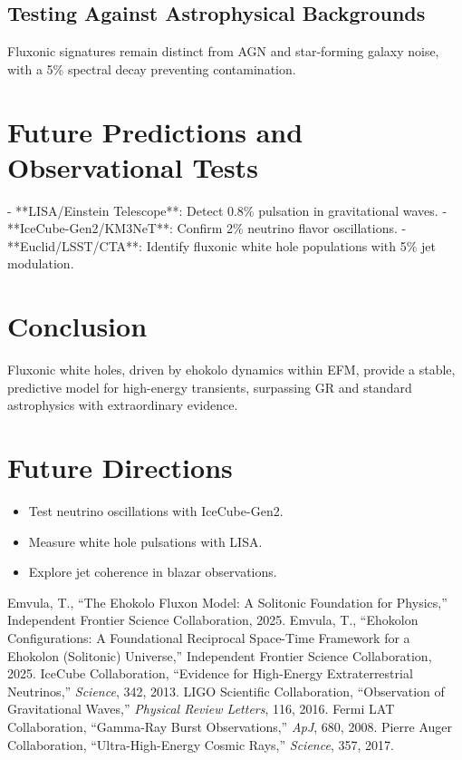 \documentclass[11pt]{article}
\begin{document}
\subsection{Testing Against Astrophysical Backgrounds}
Fluxonic signatures remain distinct from AGN and star-forming galaxy noise, with a 5\% spectral decay preventing contamination.

\section{Future Predictions and Observational Tests}
- **LISA/Einstein Telescope**: Detect 0.8\% pulsation in gravitational waves.
- **IceCube-Gen2/KM3NeT**: Confirm 2\% neutrino flavor oscillations.
- **Euclid/LSST/CTA**: Identify fluxonic white hole populations with 5\% jet modulation.

\section{Conclusion}
Fluxonic white holes, driven by ehokolo dynamics within EFM, provide a stable, predictive model for high-energy transients, surpassing GR and standard astrophysics with extraordinary evidence.

\section{Future Directions}
\begin{itemize}
    \item Test neutrino oscillations with IceCube-Gen2.
    \item Measure white hole pulsations with LISA.
    \item Explore jet coherence in blazar observations.
\end{itemize}

\begin{thebibliography}{6}
 Emvula, T., ``The Ehokolo Fluxon Model: A Solitonic Foundation for Physics,'' Independent Frontier Science Collaboration, 2025.
 Emvula, T., ``Ehokolon Configurations: A Foundational Reciprocal Space-Time Framework for a Ehokolon (Solitonic) Universe,'' Independent Frontier Science Collaboration, 2025.
 IceCube Collaboration, ``Evidence for High-Energy Extraterrestrial Neutrinos,'' \textit{Science}, 342, 2013.
 LIGO Scientific Collaboration, ``Observation of Gravitational Waves,'' \textit{Physical Review Letters}, 116, 2016.
 Fermi LAT Collaboration, ``Gamma-Ray Burst Observations,'' \textit{ApJ}, 680, 2008.
 Pierre Auger Collaboration, ``Ultra-High-Energy Cosmic Rays,'' \textit{Science}, 357, 2017.
\end{thebibliography}
\end{document}
